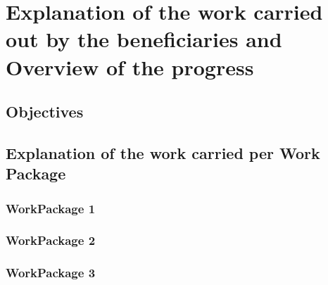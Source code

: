 \documentclass{deliverablereport}
\begin{document}
\enlargethispage{4ex}
\maketitle
\githubissuedescription
\tableofcontents\newpage



\section{Explanation of the work carried out by the beneficiaries and Overview of the progress}


\subsection{Objectives}


\subsection{Explanation of the work carried per Work Package}
\subsubsection{WorkPackage 1}


\subsubsection{WorkPackage 2}

\subsubsection{WorkPackage 3}
\end{document}
